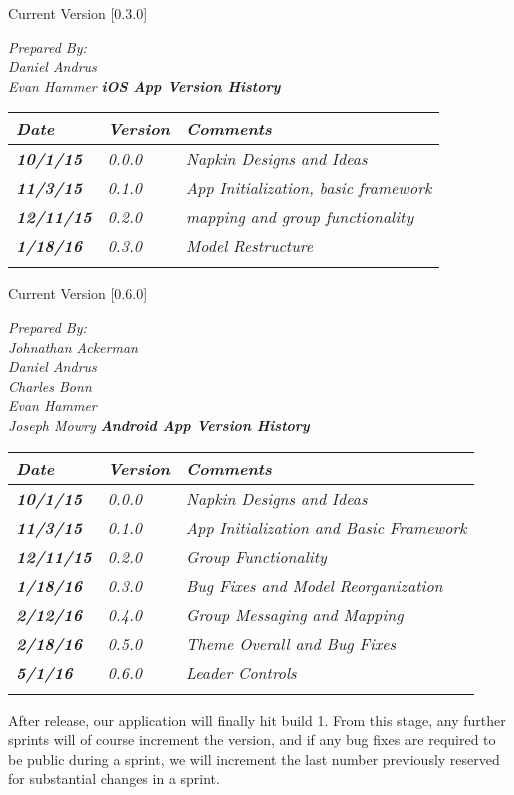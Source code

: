 Current Version [0.3.0]
\vspace*{5mm}

{\color{SDColor5}
\noindent
\textit{Prepared By:}\\
\textit{Daniel Andrus}\\
\textit{Evan Hammer}
}
\vfill
\noindent
{\color{SDColor3} \textit{\textbf{iOS App Version History}}}\\
\begin{tabular}{|>{\raggedright}p{1.5cm}|>{\raggedright}p{1.5cm}|>{\raggedright}p{9cm}|}
\hline
\textit{\textbf{Date}} &  \textit{\textbf{Version}} & \textit{\textbf{Comments}}\tabularnewline
\hline
 \textit{\textbf{10/1/15}} & \textit{0.0.0} & \textit{Napkin Designs and Ideas}\tabularnewline
 \hline
  \textit{\textbf{11/3/15}} & \textit{0.1.0} & \textit{App Initialization, basic framework}\tabularnewline
 \hline
 \textit{\textbf{12/11/15}} & \textit{0.2.0} & \textit{mapping and group functionality}\tabularnewline
\hline
 \textit{\textbf{1/18/16}} & \textit{0.3.0} & \textit{Model Restructure}\tabularnewline
 &  & \tabularnewline
\hline
\end{tabular}
\vfill

\break


Current Version [0.6.0]
\vspace*{5mm}

{\color{SDColor5}
\noindent
\textit{Prepared By:}\\
\textit{Johnathan Ackerman}\\
\textit{Daniel Andrus}\\
\textit{Charles Bonn}\\
\textit{Evan Hammer}\\
\textit{Joseph Mowry}
}
\vfill
\noindent
{\color{SDColor3} \textit{\textbf{Android App Version History}}}\\
\begin{tabular}{|>{\raggedright}p{1.5cm}|>{\raggedright}p{1.5cm}|>{\raggedright}p{9cm}|}
\hline
\textit{\textbf{Date}} &  \textit{\textbf{Version}} & \textit{\textbf{Comments}}\tabularnewline
\hline
 \textit{\textbf{10/1/15}} & \textit{0.0.0} & \textit{Napkin Designs and Ideas}\tabularnewline
 \hline
  \textit{\textbf{11/3/15}} & \textit{0.1.0} & \textit{App Initialization and Basic Framework}\tabularnewline
 \hline
 \textit{\textbf{12/11/15}} & \textit{0.2.0} & \textit{Group Functionality}\tabularnewline
\hline
 \textit{\textbf{1/18/16}} & \textit{0.3.0} & \textit{Bug Fixes and Model Reorganization}\tabularnewline
\hline
 \textit{\textbf{2/12/16}} & \textit{0.4.0} & \textit{Group Messaging and Mapping}\tabularnewline
\hline
 \textit{\textbf{2/18/16}} & \textit{0.5.0} & \textit{Theme Overall and Bug Fixes}\tabularnewline
\hline
\textit{\textbf{5/1/16}} & \textit{0.6.0} & \textit{Leader Controls}\tabularnewline
 &  & \tabularnewline
\hline
\end{tabular}
\vfill

After release, our application will finally hit build 1. From this stage, any further sprints will of course increment the version, and if any bug fixes are required to be public during a sprint, we will increment the last number previously reserved for substantial changes in a sprint.